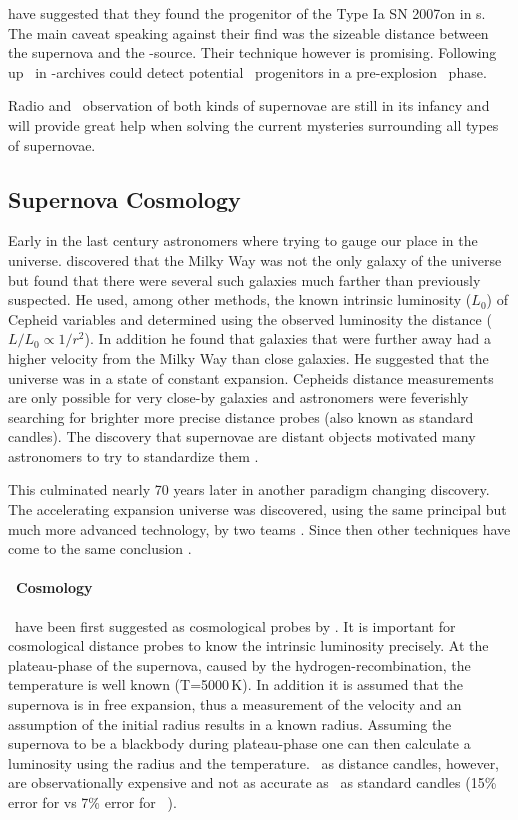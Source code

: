 \cite{2008Natur.451..802V} have suggested that they found the progenitor of the Type Ia SN 2007on in \xray s. The main caveat speaking against their find was the sizeable distance between the supernova and the \xray-source. Their technique however is promising. Following up \sneia\ in \xray-archives could detect potential \sneia\ progenitors in a pre-explosion \xray\ phase.

Radio and \xray\ observation of both kinds of supernovae are still in its infancy and will provide great help when solving the current mysteries surrounding all types of supernovae.

\subsection{Supernova Cosmology}
Early in the last century astronomers where trying to gauge our place in the universe. \citet{1929PNAS...15..168H} discovered that the Milky Way was not the only galaxy of the universe but found that there were several such galaxies much farther than previously suspected. He used, among other methods, the known intrinsic luminosity ($L_0$) of Cepheid variables and determined using the observed luminosity the distance ($L/L_0 \propto 1/r^2$).  In addition he found that galaxies that were further away had a higher velocity from the Milky Way than close galaxies. He suggested that the universe was in a state of constant expansion. Cepheids distance measurements are only possible for very close-by galaxies and astronomers were feverishly searching for brighter more precise distance probes (also known as standard candles). The discovery that supernovae are distant objects \citep{1934PNAS...20..254B} motivated many astronomers to try to standardize them \cite{1938ApJ....88..285B, 1960ZA.....49..201V, 1968AJ.....73.1021K, 1999ApJ...517..565P}. 

This culminated nearly 70 years later in another paradigm changing discovery. The accelerating expansion universe was discovered, using the same principal but much more advanced technology, by two teams \citep{1998AJ....116.1009R}. 
Since then other techniques have come to the same conclusion \cite[e.g.]{2011MNRAS.tmp..951B}.

\paragraph{\snii\ Cosmology}
\sniip\ have been first suggested as cosmological probes by \citet{1974ApJ...193...27K}. It is important for cosmological distance probes to know the intrinsic luminosity precisely. At the plateau-phase of the supernova, caused by the hydrogen-recombination,  the temperature is well known (T=5000\,K). In addition it is assumed that the supernova is in free expansion, thus a measurement of the velocity and an assumption of the initial radius results in a known radius. Assuming the supernova to be a blackbody during plateau-phase one can then calculate a luminosity using the radius and the temperature. \sniip\ as distance candles, however, are observationally expensive and not as accurate as \snia\ as standard candles (15\% error for \snii  vs 7\% error for \snia\ \citep{2006ApJ...645..841N}).

